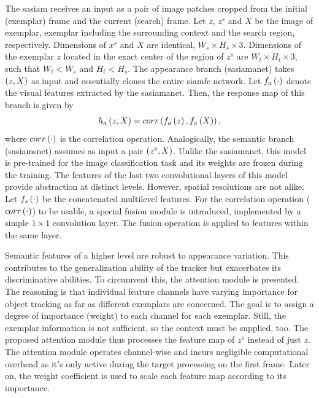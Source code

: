 The \gls{sasiam} receives an input as a pair of image patches cropped from the initial (exemplar) frame and the current (search) frame. Let $z$, $z^s$ and $X$ be the image of exemplar, exemplar including the surrounding context and the search region, respectively. Dimensions of $x^s$ and $X$ are identical, $W_s \times H_s \times 3$. Dimensions of the exemplar $z$ located in the exact center of the region of $z^s$ are $W_t \times H_t \times 3$, such that $W_t < W_s$ and $H_t < H_s$. The appearance branch (\gls{sasiamanet}) takes $\left( {z, X} \right)$ as input and essentially clones the entire \gls{siamfc} network. Let ${f_a} \left( \cdot \right)$ denote the visual features extracted by the \gls{sasiamanet}. Then, the response map of this branch is given by
\begin{equation}
    \label{eq:SiameseCrossCorrelation}
    {h_a} \left( z, X \right) = {corr} \left( {f_a} \left( z \right), {f_a} \left( X \right) \right),
\end{equation}
where ${corr} \left( \cdot \right)$ is the correlation operation. Analogically, the semantic branch (\gls{sasiamsnet}) assumes as input a pair $\left( {z^s, X} \right)$. Unlike the \gls{sasiamanet}, this model is pre-trained for the image classification task and its weights are frozen during the training. The features of the last two convolutional layers of this model provide abstraction at distinct levels. However, spatial resolutions are not alike. Let ${f_s} \left( \cdot \right)$ be the concatenated multilevel features. For the correlation operation (${corr} \left( \cdot \right)$) to be usable, a special fusion module is introduced, implemented by a simple $1 \times 1$ convolution layer. The fusion operation is applied to features within the same layer.

Semantic features of a higher level are robust to appearance variation. This contributes to the generalization ability of the tracker but exacerbates its discriminative abilities. To circumvent this, the attention module is presented. The reasoning is that individual feature channels have varying importance for object tracking as far as different exemplars are concerned. The goal is to assign a degree of importance (weight) to each channel for each exemplar. Still, the exemplar information is not sufficient, so the context must be supplied, too. The proposed attention module thus processes the feature map of $z^s$ instead of just $z$. The attention module operates channel-wise and incurs negligible computational overhead as it's only active during the target processing on the first frame. Later on, the weight coefficient is used to scale each feature map according to its importance.

